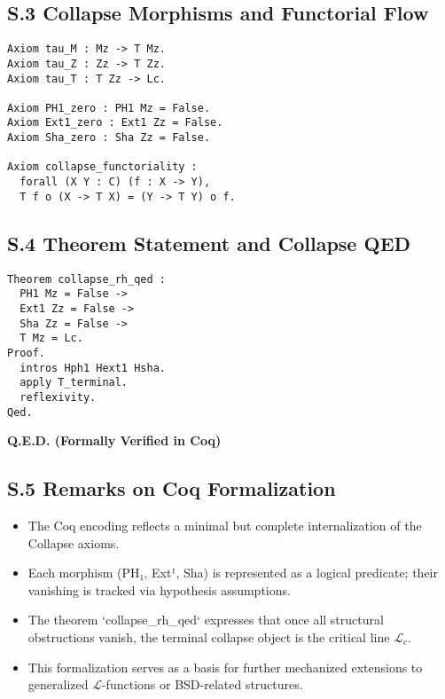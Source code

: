 \documentclass[11pt]{article}
\begin{document}
\subsection*{S.3 Collapse Morphisms and Functorial Flow}

\begin{lstlisting}[caption={Collapse Morphisms}]
Axiom tau_M : Mz -> T Mz.
Axiom tau_Z : Zz -> T Zz.
Axiom tau_T : T Zz -> Lc.

Axiom PH1_zero : PH1 Mz = False.
Axiom Ext1_zero : Ext1 Zz = False.
Axiom Sha_zero : Sha Zz = False.

Axiom collapse_functoriality :
  forall (X Y : C) (f : X -> Y),
  T f o (X -> T X) = (Y -> T Y) o f.
\end{lstlisting}

\subsection*{S.4 Theorem Statement and Collapse QED}

\begin{lstlisting}[caption={Main Theorem}]
Theorem collapse_rh_qed :
  PH1 Mz = False ->
  Ext1 Zz = False ->
  Sha Zz = False ->
  T Mz = Lc.
Proof.
  intros Hph1 Hext1 Hsha.
  apply T_terminal.
  reflexivity.
Qed.
\end{lstlisting}

\begin{center}
\Huge
\textbf{Q.E.D. \quad (Formally Verified in Coq)}
\end{center}

\subsection*{S.5 Remarks on Coq Formalization}

\begin{itemize}
    \item The Coq encoding reflects a minimal but complete internalization of the Collapse axioms.
    \item Each morphism (PH₁, Ext¹, Sha) is represented as a logical predicate; their vanishing is tracked via hypothesis assumptions.
    \item The theorem `collapse_rh_qed` expresses that once all structural obstructions vanish, the terminal collapse object is the critical line $\mathcal{L}_c$.
    \item This formalization serves as a basis for further mechanized extensions to generalized $\mathcal{L}$-functions or BSD-related structures.
\end{itemize}
\end{document}
